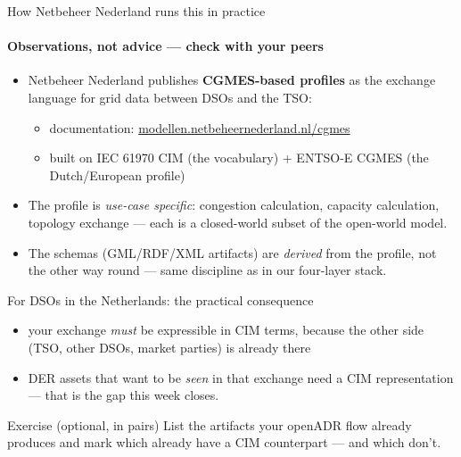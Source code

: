 \begin{frame}{How Netbeheer Nederland runs this in practice}
  \framesubtitle{Observations, not advice — check with your peers}
  \footnotesize
  \setlength{\itemsep}{0.5pt}
  \setlength{\parsep}{0pt}

  \begin{itemize}
    \item Netbeheer Nederland publishes \textbf{CGMES-based profiles} as the exchange language for grid data between DSOs and the TSO:
    \begin{itemize}
      \item documentation: \href{https://modellen.netbeheernederland.nl/cgmes/}{modellen.netbeheernederland.nl/cgmes}
      \item built on IEC 61970 CIM (the vocabulary) + ENTSO-E CGMES (the Dutch/European profile)
    \end{itemize}
    \pause
    \item The profile is \emph{use-case specific}: congestion calculation, capacity calculation, topology exchange — each is a closed-world subset of the open-world model.
    \pause
    \item The schemas (GML/RDF/XML artifacts) are \emph{derived} from the profile, not the other way round — same discipline as in our four-layer stack.
  \end{itemize}
\end{frame}

\begin{frame}{For DSOs in the Netherlands: the practical consequence}
  \footnotesize
  \setlength{\itemsep}{0.5pt}
  \setlength{\parsep}{0pt}

  \begin{itemize}
    \item your exchange \emph{must} be expressible in CIM terms, because the other side (TSO, other DSOs, market parties) is already there
    \item DER assets that want to be \emph{seen} in that exchange need a CIM representation — that is the gap this week closes.
  \end{itemize}

  \vspace{0.2cm}
  \begin{block}{Exercise (optional, in pairs)}
    List the artifacts your openADR flow already produces and mark which already have a CIM counterpart — and which don't.
  \end{block}
\end{frame}
